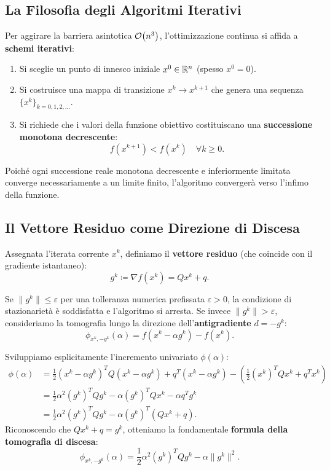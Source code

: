 \subsection{La Filosofia degli Algoritmi Iterativi}
Per aggirare la barriera asintotica $\mathcal{O}\!\left(n^3\right)$, l'ottimizzazione continua si affida a \textbf{schemi iterativi}:
\begin{enumerate}
    \item Si sceglie un punto di innesco iniziale $x^0 \in \mathbb{R}^n$ (spesso $x^0 = 0$).
    \item Si costruisce una mappa di transizione $x^k \to x^{k+1}$ che genera una sequenza $\{x^k\}_{k=0, 1, 2, \dots}$.
    \item Si richiede che i valori della funzione obiettivo costituiscano una \textbf{successione monotona decrescente}:
    \begin{equation}
        f(x^{k+1}) < f(x^k) \quad \forall k \ge 0.
    \end{equation}
\end{enumerate}
Poich\'e ogni successione reale monotona decrescente e inferiormente limitata converge necessariamente a un limite finito, l'algoritmo converger\`a verso l'infimo della funzione.

\subsection{Il Vettore Residuo come Direzione di Discesa}
Assegnata l'iterata corrente $x^k$, definiamo il \textbf{vettore residuo} (che coincide con il gradiente istantaneo):
\begin{equation}
    g^k \coloneqq \nabla f(x^k) = Q x^k + q.
\end{equation}

Se $\|g^k\| \le \varepsilon$ per una tolleranza numerica prefissata $\varepsilon > 0$, la condizione di stazionariet\`a \`e soddisfatta e l'algoritmo si arresta.
Se invece $\|g^k\| > \varepsilon$, consideriamo la tomografia lungo la direzione dell'\textbf{antigradiente} $d = -g^k$:
\begin{equation}
    \phi_{x^k, -g^k}(\alpha) = f(x^k - \alpha g^k) - f(x^k).
\end{equation}

Sviluppiamo esplicitamente l'incremento univariato $\phi(\alpha)$:
\begin{align}
    \phi(\alpha) &= \frac{1}{2} (x^k - \alpha g^k)^T Q (x^k - \alpha g^k) + q^T (x^k - \alpha g^k) - \left( \frac{1}{2} (x^k)^T Q x^k + q^T x^k \right) \nonumber \\
    &= \frac{1}{2} \alpha^2 (g^k)^T Q g^k - \alpha (g^k)^T Q x^k - \alpha q^T g^k \nonumber \\
    &= \frac{1}{2} \alpha^2 (g^k)^T Q g^k - \alpha (g^k)^T (Q x^k + q).
\end{align}
Riconoscendo che $Q x^k + q = g^k$, otteniamo la fondamentale \textbf{formula della tomografia di discesa}:
\begin{equation}
    \phi_{x^k, -g^k}(\alpha) = \frac{1}{2} \alpha^2 (g^k)^T Q g^k - \alpha \|g^k\|^2.
    \label{eq:tomografia-antigradiente}
\end{equation}

